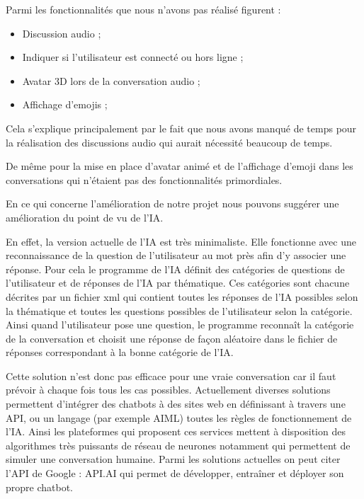 
Parmi les fonctionnalités que nous n'avons pas réalisé figurent : 

\begin{itemize}
	\item Discussion audio ;
	\item Indiquer si l'utilisateur est connecté ou hors ligne ;
	\item Avatar 3D lors de la conversation audio ;
	\item Affichage d’emojis ;
\end{itemize}

\par Cela s'explique principalement par le fait que nous avons manqué de temps pour la réalisation des discussions audio qui aurait nécessité beaucoup de temps.

\par De même pour la mise en place d'avatar animé et de l'affichage d'emoji dans les conversations qui n'étaient pas des fonctionnalités primordiales.  \\


\par En ce qui concerne l’amélioration de notre projet nous pouvons suggérer une amélioration du point de vu de l'IA.

\par En effet, la version actuelle de l'IA est très minimaliste. Elle fonctionne avec une reconnaissance de la question de l'utilisateur au mot près afin d'y associer une réponse. Pour cela le programme de l'IA définit des catégories de questions de l'utilisateur et de réponses de l'IA par thématique. Ces catégories sont chacune décrites par un fichier xml qui contient toutes les réponses de l'IA possibles selon la thématique et toutes les questions possibles de l’utilisateur selon la catégorie. Ainsi quand l'utilisateur pose une question, le programme reconnaît la catégorie de la conversation et choisit une réponse de façon aléatoire dans le fichier de réponses correspondant à la bonne catégorie de l'IA. 

\par Cette solution n'est donc pas efficace pour une vraie conversation car il faut prévoir à chaque fois tous les cas possibles. Actuellement diverses solutions permettent d'intégrer des chatbots à des sites web en définissant à travers une API, ou un langage (par exemple AIML) toutes les règles de fonctionnement de l'IA. Ainsi les plateformes qui proposent ces services mettent à disposition des algorithmes très puissants de réseau de neurones notamment qui permettent de simuler une conversation humaine. Parmi les solutions actuelles on peut citer l'API de Google : API.AI qui permet de développer, entraîner et déployer son propre chatbot. \\ 

